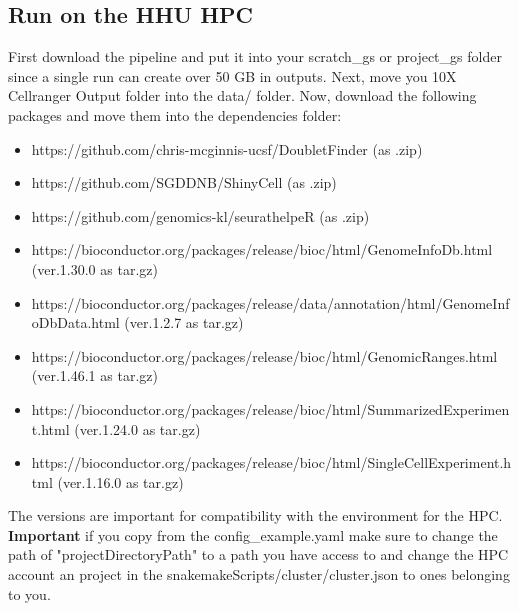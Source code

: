 \subsection{Run on the HHU HPC}
First download the pipeline and put it into your scratch\_gs or project\_gs folder since a single run can create over 50 GB in outputs. Next, move you 10X Cellranger Output folder into the data/ folder. Now, download the following packages and move them into the dependencies folder:
\begin{itemize}
	\item https://github.com/chris-mcginnis-ucsf/DoubletFinder (as .zip)
	\item https://github.com/SGDDNB/ShinyCell (as .zip)
	\item https://github.com/genomics-kl/seurathelpeR (as .zip)
	\item https://bioconductor.org/packages/release/bioc/html/GenomeInfoDb.html (ver.1.30.0 as tar.gz)
	\item https://bioconductor.org/packages/release/data/annotation/html/GenomeInfoDbData.html (ver.1.2.7 as tar.gz)
	\item https://bioconductor.org/packages/release/bioc/html/GenomicRanges.html (ver.1.46.1 as tar.gz)
	\item https://bioconductor.org/packages/release/bioc/html/SummarizedExperiment.html (ver.1.24.0 as tar.gz)
	\item https://bioconductor.org/packages/release/bioc/html/SingleCellExperiment.html (ver.1.16.0 as tar.gz)
\end{itemize}
The versions are important for compatibility with the environment for the HPC. \textbf{Important} if you copy from the config\_example.yaml make sure to change the path of "projectDirectoryPath" to a path you have access to and change the HPC account an project in the snakemakeScripts/cluster/cluster.json to ones belonging to you.

